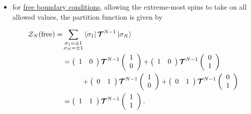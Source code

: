 \documentclass{homework}
\begin{document}
\begin{itemize}
    \item for \underline{free boundary conditions}, allowing the extreme-most spins to take on all allowed values, the partition function is given by 
    
    \begin{equation}
    \begin{split}
     \mathcal{Z}_N(\textnormal{free}) = & \sum_{\substack{\sigma_1 = \pm 1\\
    \sigma_N = \pm 1}} \bra{\sigma_1} \bm{\mathcal{T}}^{N-1} \ket{\sigma_N} \\
    &=  \left(\begin{array}{cc}
        1 & 0 \\
    \end{array}\right) \bm{\mathcal{T}}^{N-1} \left(\begin{array}{c}
        1 \\
        0
    \end{array}\right)  +\left(\begin{array}{cc}
        1 & 0 \\
    \end{array}\right) \bm{\mathcal{T}}^{N-1} \left(\begin{array}{c}
        0 \\
        1
    \end{array}\right) \\
    &  \textnormal{ }\textnormal{ }\textnormal{ }\textnormal{ }\textnormal{ }\textnormal{ }\textnormal{ }\textnormal{ } + \left(\begin{array}{cc}
        0 & 1 \\
    \end{array}\right) \bm{\mathcal{T}}^{N-1} \left(\begin{array}{c}
        1 \\
        0 
    \end{array}\right) + 
    \left(\begin{array}{cc}
        0 & 1 \\
    \end{array}\right) \bm{\mathcal{T}}^{N-1} \left(\begin{array}{c}
        0 \\
        1 
    \end{array}\right)
    \\
    &= \left(\begin{array}{cc}
        1 & 1 \\
    \end{array}\right) \bm{\mathcal{T}}^{N-1} \left(\begin{array}{c}
        1 \\
        1 
    \end{array}\right).
    \end{split}
    \label{Ising model - Free PF}
    \end{equation}
    

\end{itemize}
\end{document}
